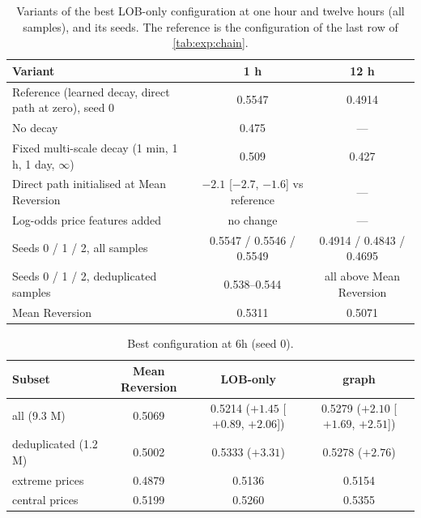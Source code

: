\begin{table}[t]
\centering
\caption{Variants of the best LOB-only configuration at one hour and twelve hours (all
samples), and its seeds.  The reference is the configuration of the last row of
\cref{tab:exp:chain}.}
\label{tab:app:variants}
\small
\begin{fittable}\begin{tabular}{lcc}
\toprule
Variant & 1 h & 12 h \\
\midrule
Reference (learned decay, direct path at zero), seed 0 & 0.5547 & 0.4914 \\
No decay & 0.475 & --- \\
Fixed multi-scale decay (1 min, 1 h, 1 day, $\infty$) & 0.509 & 0.427 \\
Direct path initialised at Mean Reversion & $-2.1$ [$-2.7$, $-1.6$] vs reference & --- \\
Log-odds price features added & no change & --- \\
\midrule
Seeds 0 / 1 / 2, all samples & 0.5547 / 0.5546 / 0.5549 & 0.4914 / 0.4843 / 0.4695 \\
Seeds 0 / 1 / 2, deduplicated samples & 0.538--0.544 & all above Mean Reversion \\
Mean Reversion & 0.5311 & 0.5071 \\
\bottomrule
\end{tabular}\end{fittable}
\end{table}

\begin{table}[t]
\centering
\caption{Best configuration at 6h (seed 0).}
\label{tab:exp:6h}
\begin{fittable}\begin{tabular}{lccc}
\toprule
Subset & Mean Reversion & LOB-only & graph \\
\midrule
all (9.3 M)           & 0.5069 & 0.5214 ($+1.45$ [$+0.89$, $+2.06$]) & 0.5279 ($+2.10$ [$+1.69$, $+2.51$]) \\
deduplicated (1.2 M)  & 0.5002 & 0.5333 ($+3.31$)                      & 0.5278 ($+2.76$) \\
extreme prices        & 0.4879 & 0.5136                                & 0.5154 \\
central prices        & 0.5199 & 0.5260                                & 0.5355 \\
\bottomrule
\end{tabular}\end{fittable}
\end{table}

